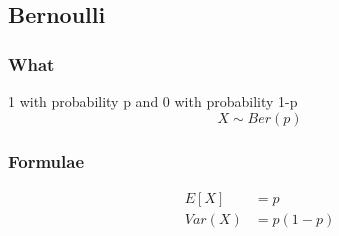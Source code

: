 \documentclass[12pt]{amsart}
\begin{document}
\subsection{Bernoulli}
\subsubsection{What}
1 with probability p and 0 with probability 1-p
\[
X \sim Ber(p)
\]
\subsubsection{Formulae}
\begin{align*}
E[X] &= p \\
Var(X) &= p(1-p)
\end{align*}
\end{document}

